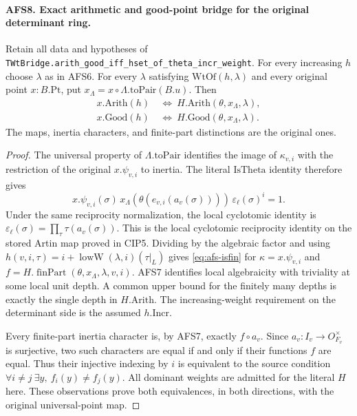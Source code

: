 \documentclass[11pt,a4paper]{article}
\numberwithin{equation}{section}
\theoremstyle{remark}\newtheorem{remark}[theorem]{Remark}
\begin{document}
\paragraph{AFS8. Exact arithmetic and good-point bridge for the original determinant ring.}
\label{claim:AFS8}
Retain all data and hypotheses of
\texttt{TWt\allowbreak Bridge.\allowbreak arith\_\allowbreak good\_\allowbreak iff\_\allowbreak hset\_\allowbreak of\_\allowbreak theta\_\allowbreak incr\_\allowbreak weight}.
For every increasing $h$ choose $\lambda$ as in AFS6.  For
every $\lambda$ satisfying $\mathrm{WtOf}(h,\lambda)$ and
every original point $x:B.\mathrm{Pt}$, put
$x_\Lambda=x\circ\Lambda.\mathrm{toPair}(B.u)$.  Then
\begin{align*}
 x.\mathrm{Arith}(h)&\ \Longleftrightarrow\
       H.\mathrm{Arith}(\theta,x_\Lambda,\lambda),\\
 x.\mathrm{Good}(h)&\ \Longleftrightarrow\
       H.\mathrm{Good}(\theta,x_\Lambda,\lambda).
\end{align*}
The maps, inertia characters, and finite-part distinctions are
the original ones.
\begin{proof}
The universal property of $\Lambda.\mathrm{toPair}$ identifies
the image of $\kappa_{v,i}$ with the restriction of the
original $x.\psi_{v,i}$ to inertia.  The literal
$\mathrm{IsTheta}$ identity therefore gives
\[
 x.\psi_{v,i}(\sigma)\,
 x_\Lambda(\theta(e_{v,i}(a_v(\sigma))))\,
                         \varepsilon_\ell(\sigma)^i=1.
\]
Under the same reciprocity normalization, the local cyclotomic
identity is
$\varepsilon_\ell(\sigma)=\prod_\tau\tau(a_v(\sigma))$.
This is the local cyclotomic reciprocity identity on the
stored Artin map proved in CIP5.  Dividing by the
algebraic factor and using
$h(v,i,\tau)=i+\operatorname{lowW}(\lambda,i)(\tau|_L)$
gives \eqref{eq:afs-isfin} for
$\kappa=x.\psi_{v,i}$ and
$f=H.\operatorname{finPart}(\theta,x_\Lambda,\lambda,v,i)$.
AFS7 identifies local algebraicity with triviality at some
local unit depth.  A common upper bound for the finitely
many depths is exactly the single depth in $H.\mathrm{Arith}$.
The increasing-weight requirement on the determinant side
is the assumed $h.\mathrm{Incr}$.

Every finite-part inertia character is, by AFS7, exactly
$f\circ a_v$.  Since $a_v:I_v\to O_{F_v}^{\times}$ is
surjective, two such characters are equal if and only if
their functions $f$ are equal.  Thus their injective indexing
by $i$ is equivalent to the source condition
$\forall i\ne j\ \exists y,\ f_i(y)\ne f_j(y)$.
All dominant weights are admitted for the literal $H$ here.
These observations prove both equivalences, in both
directions, with the original universal-point map.
\end{proof}
\end{document}
